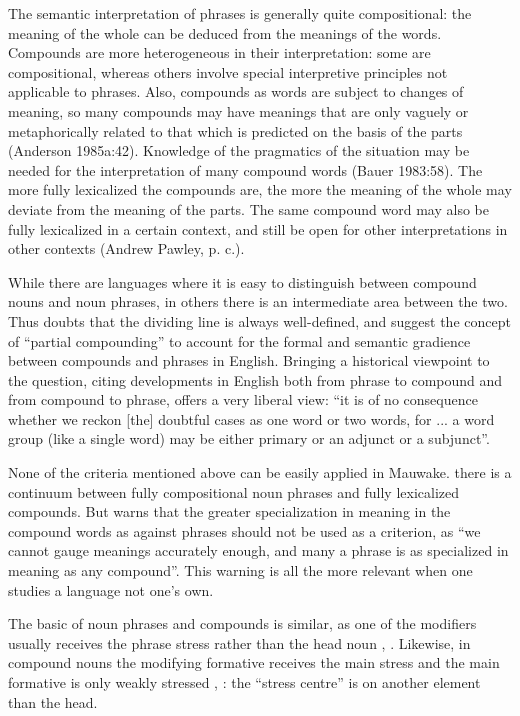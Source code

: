 The semantic interpretation of phrases is generally quite compositional: the meaning of the whole can be deduced from the meanings of the words. Compounds are more heterogeneous in their interpretation: some are compositional, whereas others involve special interpretive principles not applicable to phrases. Also, compounds as words are subject to changes of meaning, so many compounds may have meanings that are only vaguely or metaphorically related to that which is predicted on the basis of the parts (Anderson{ 1985a}:42). Knowledge of the pragmatics of the situation may be needed for the interpretation of many compound words (Bauer{ 1983}:58). The more fully lexicalized the compounds are, the more the meaning of the whole may deviate from the meaning of the parts. The same compound word may also be fully lexicalized in a certain context, and still be open for other interpretations in other contexts (Andrew Pawley, p. c.). 

While there are languages where it is easy to distinguish between compound nouns and noun phrases, in others there is an intermediate area between the two. Thus \citet[810]{Downing1977} doubts that the dividing line is always well-defined, and  \citet[1569]{QuirkEtAl1989} suggest the concept of ``partial compounding'' to account for the formal and semantic gradience between compounds and phrases in English. Bringing a historical viewpoint to the question, citing developments in English both from phrase to compound and from compound to phrase, \citet[102]{Jespersen1924} offers a very liberal view: ``it is of no consequence whether we reckon [the] doubtful cases as one word or two words, for ... a word group (like a single word) may be either primary or an adjunct or a subjunct''. 

None of the criteria mentioned above can be easily applied in Mauwake.  there is a continuum between fully compositional noun phrases and fully lexicalized compounds. But \citet[227]{Bloomfield1933} warns that the greater specialization in meaning in the compound words as against phrases should not be used as a criterion, as ``we cannot gauge meanings accurately enough, and many a phrase is as specialized in meaning as any compound''. This warning is all the more relevant when one studies a language not one's own. 

The basic  of noun phrases and compounds is similar, as one of the modifiers usually receives the phrase stress rather than the head noun , . Likewise, in compound nouns the modifying formative receives the main stress and the main formative is only weakly stressed , : the ``stress centre'' \citep[45]{Anderson1985a} is on another element than the head. 

